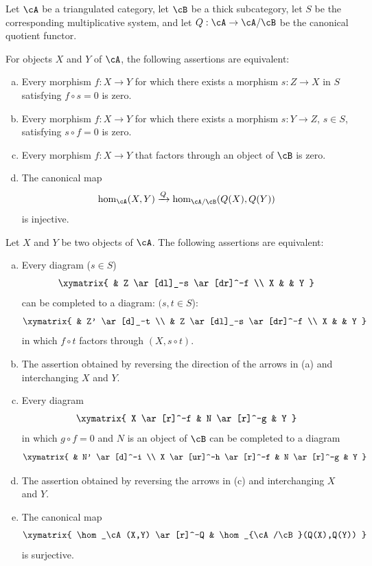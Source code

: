 Let $\cA$ be a triangulated category, let $\cB$ be a thick subcategory,
let $S$ be the corresponding multiplicative system, and let
$Q:\cA\to \cA/\cB$ be the canonical quotient functor.

\begin{proposition}\label{VIII:2-5-1}
For objects $X$ and $Y$ of $\cA$, the following assertions are equivalent:
\begin{enumerate}[(a)]
  \item Every morphism $f:X\to Y$ for which there exists a morphism
    $s:Z\to X$ in $S$ satisfying $f\circ s=0$ is zero.
  \item Every morphism $f:X\to Y$ for which there exists a morphism
    $s:Y\to Z$, $s\in S$, satisfying $s\circ f=0$ is zero.
  \item {}Every morphism $f:X\to Y$ that factors through an object of $\cB$
    is zero.
  \item The canonical map
    \[
      \hom_\cA(X,Y) \xrightarrow{Q} \hom_{\cA/\cB}(Q(X),Q(Y))
    \]
    is injective.
\end{enumerate}
\end{proposition}

\begin{proposition}\label{VIII:2-5-2}
Let $X$ and $Y$ be two objects of $\cA$. The following assertions are
equivalent:
\begin{enumerate}[(a)]
  \item Every diagram ($s\in S$)
    \[\xymatrix{
      & Z \ar[dl]_-s \ar[dr]^-f \\
      X
        & & Y
    }\]
    can be completed to a diagram: $(s,t\in S$):
    \[\xymatrix{
      & Z' \ar[d]_-t \\
      & Z \ar[dl]_-s \ar[dr]^-f \\
      X
        & & Y
    }\]
    in which $f\circ t$ factors through $(X,s\circ t)$.
  \item The assertion obtained by reversing the direction of the arrows in
    (a) and interchanging $X$ and $Y$.
  \item Every diagram
    \[\xymatrix{
      X \ar[r]^-f
        & N \ar[r]^-g
        & Y
    }\]
    in which $g\circ f=0$ and $N$ is an object of $\cB$ can be completed
    to a diagram
    \[\xymatrix{
      & N' \ar[d]^-i \\
      X \ar[ur]^-h \ar[r]^-f
        & N \ar[r]^-g
        & Y
    }\]
  \item The assertion obtained by reversing the arrows in (c) and
    interchanging $X$ and $Y$.
  \item The canonical map
    \[\xymatrix{
      \hom_\cA(X,Y) \ar[r]^-Q
        & \hom_{\cA/\cB}(Q(X),Q(Y))
    }\]
    is surjective.
\end{enumerate}
\end{proposition}

